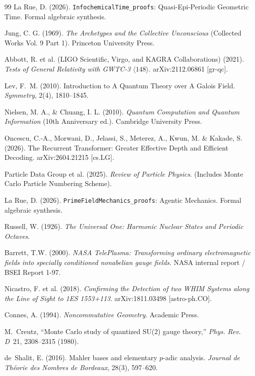 \begin{thebibliography}{99}
La Rue, D. (2026).
\texttt{InfochemicalTime\_proofs}: Quasi-Epi-Periodic Geometric Time.
Formal algebraic synthesis.

Jung, C. G. (1969).
\textit{The Archetypes and the Collective Unconscious} (Collected Works Vol. 9 Part 1).
Princeton University Press.

Abbott, R. et al. (LIGO Scientific, Virgo, and KAGRA Collaborations) (2021).
\textit{Tests of General Relativity with GWTC-3} $\langle 148 \rangle$.
arXiv:2112.06861 [gr-qc].

Lev, F.~M. (2010).
Introduction to A Quantum Theory over A Galois Field.
\textit{Symmetry}, 2(4), 1810--1845.

Nielsen, M. A., \& Chuang, I. L. (2010).
\textit{Quantum Computation and Quantum Information} (10th Anniversary ed.). Cambridge University Press.

Oncescu, C.-A., Morwani, D., Jelassi, S., Meterez, A., Kwun, M. \& Kakade, S. (2026).
The Recurrent Transformer: Greater Effective Depth and Efficient Decoding.
arXiv:2604.21215 [cs.LG].

Particle Data Group et al. (2025).
\textit{Review of Particle Physics}. 
(Includes Monte Carlo Particle Numbering Scheme).

La Rue, D. (2026).
\texttt{PrimeFieldMechanics\_proofs}: Agentic Mechanics.
Formal algebraic synthesis.

Russell, W. (1926).
\textit{The Universal One: Harmonic Nuclear States and Periodic Octaves}.

Barrett, T.W. (2000).
\textit{NASA TelePlasma: Transforming ordinary electromagnetic fields into specially conditioned nonabelian gauge fields}.
NASA internal report / BSEI Report 1-97.

Nicastro, F. et al. (2018).
\textit{Confirming the Detection of two WHIM Systems along the Line of Sight to 1ES 1553+113}.
arXiv:1811.03498 [astro-ph.CO].

Connes, A. (1994). \emph{Noncommutative Geometry}. Academic Press.

M.~Creutz,
``Monte Carlo study of quantized SU(2) gauge theory,''
\emph{Phys. Rev. D}\ 21, 2308--2315 (1980).

de~Shalit, E. (2016).
Mahler bases and elementary $p$-adic analysis.
\textit{Journal de Th\'eorie des Nombres de Bordeaux}, 28(3), 597--620.


\end{thebibliography}
